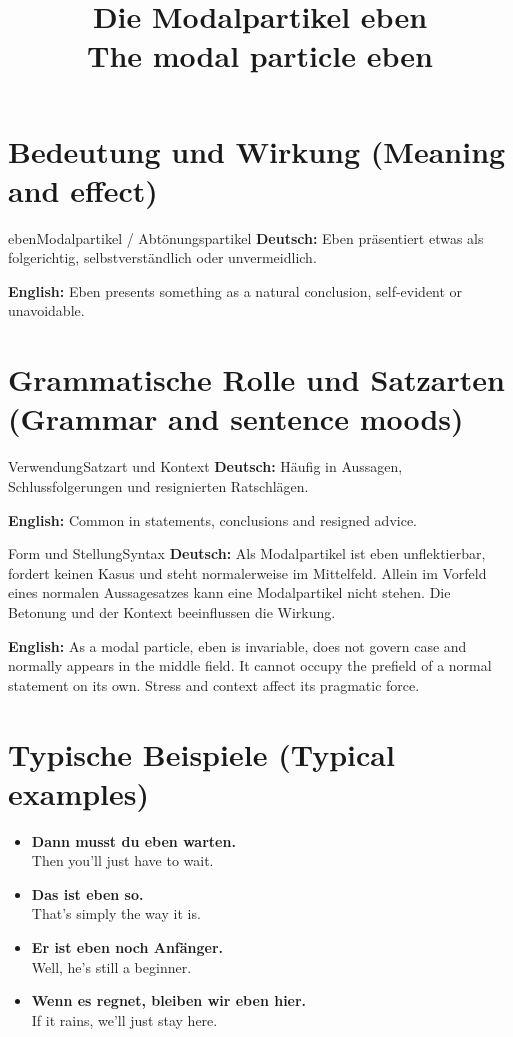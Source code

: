 \documentclass[a4paper,11pt]{article}
\title{Die Modalpartikel \glqq eben\grqq\\{\large\textnormal{The modal particle eben}}}
\date{}
\newcommand{\GermanText}[1]{\textbf{Deutsch: }#1\par}
\newcommand{\EnglishText}[1]{{\small\color{SoftGray}\textbf{English: }#1\par}}
\newcommand{\ExampleItem}[2]{\item \textbf{#1}\\{\small\color{SoftGray}#2}}
\begin{document}
\maketitle
\tableofcontents
\section{Bedeutung und Wirkung \textnormal{(Meaning and effect)}}
\begin{grammarentry}{eben}{Modalpartikel / Abtönungspartikel}
\GermanText{Eben präsentiert etwas als folgerichtig, selbstverständlich oder unvermeidlich.}
\EnglishText{Eben presents something as a natural conclusion, self-evident or unavoidable.}
\end{grammarentry}
\section{Grammatische Rolle und Satzarten \textnormal{(Grammar and sentence moods)}}
\begin{grammarentry}{Verwendung}{Satzart und Kontext}
\GermanText{Häufig in Aussagen, Schlussfolgerungen und resignierten Ratschlägen.}
\EnglishText{Common in statements, conclusions and resigned advice.}
\end{grammarentry}
\begin{grammarentry}{Form und Stellung}{Syntax}
\GermanText{Als Modalpartikel ist eben unflektierbar, fordert keinen Kasus und steht normalerweise im Mittelfeld. Allein im Vorfeld eines normalen Aussagesatzes kann eine Modalpartikel nicht stehen. Die Betonung und der Kontext beeinflussen die Wirkung.}
\EnglishText{As a modal particle, eben is invariable, does not govern case and normally appears in the middle field. It cannot occupy the prefield of a normal statement on its own. Stress and context affect its pragmatic force.}
\end{grammarentry}
\section{Typische Beispiele \textnormal{(Typical examples)}}
\begin{exbox}\begin{itemize}
\ExampleItem{Dann musst du eben warten.}{Then you'll just have to wait.}
\ExampleItem{Das ist eben so.}{That's simply the way it is.}
\ExampleItem{Er ist eben noch Anfänger.}{Well, he's still a beginner.}
\ExampleItem{Wenn es regnet, bleiben wir eben hier.}{If it rains, we'll just stay here.}
\end{itemize}\end{exbox}
\end{document}
